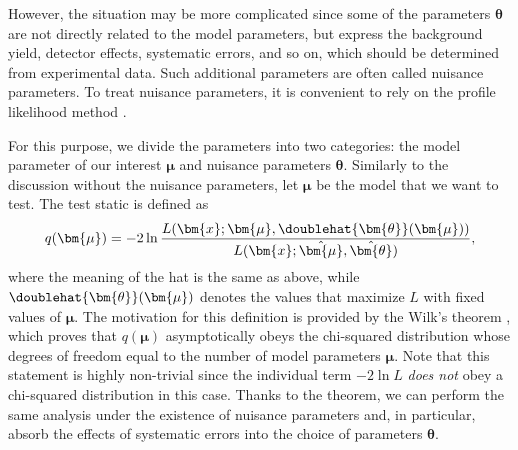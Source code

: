 \documentclass[12pt,twoside,book]{article}
\begin{document}
However, the situation may be more complicated since some of the parameters $\bm{\theta}$ are not directly related to the model parameters, but express the background yield, detector effects, systematic errors, and so on, which should be determined from experimental data.
Such additional parameters are often called nuisance parameters.
To treat nuisance parameters, it is convenient to rely on the profile likelihood method \cite{Cowan:2010js}.

For this purpose, we divide the parameters into two categories: the model parameter of our interest $\bm{\mu}$ and nuisance parameters $\bm{\theta}$.
Similarly to the discussion without the nuisance parameters, let $\bm{\mu}$ be the model that we want to test.
The test static is defined as
\begin{align}
  q (\bm{\mu}) =
  -2 \ln \frac{L(\bm{x} ; \bm{\mu}, \doublehat{\bm{\theta}} (\bm{\mu}))}
  {L(\bm{x} ; \hat{\bm{\mu}}, \hat{\bm{\theta}})},
\end{align}
where the meaning of the hat is the same as above, while $\doublehat{\bm{\theta}} (\bm{\mu})$ denotes the values that maximize $L$ with fixed values of $\bm{\mu}$.
The motivation for this definition is provided by the Wilk's theorem \cite{wilks1938}, which proves that $q (\bm{\mu})$ asymptotically obeys the chi-squared distribution whose degrees of freedom equal to the number of model parameters $\bm{\mu}$.
Note that this statement is highly non-trivial since the individual term $-2\ln L$ \textit{does not} obey a chi-squared distribution in this case.
Thanks to the theorem, we can perform the same analysis under the existence of nuisance parameters and, in particular, absorb the effects of systematic errors into the choice of parameters $\bm{\theta}$.


% 
% 
\end{document}

